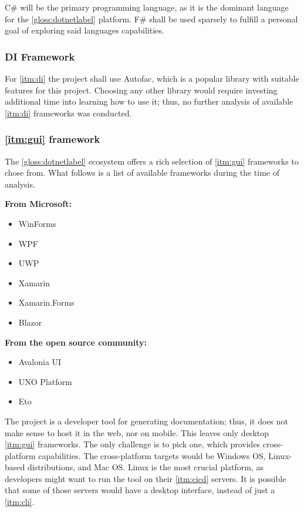 C\# will be the primary programming language, as it is the dominant language for the \ref{gloss:dotnetlabel} platform.
F\# shall be used sparsely to fulfill a personal goal of exploring said languages capabilities.

\subsubsection{DI Framework}

For \ref{itm:di} the project shall use Autofac, which is a popular library with suitable features for this project. Choosing any other library would require investing additional time into learning how to use it; thus, no further analysis of available \ref{itm:di} frameworks was conducted.

\subsubsection{\ref{itm:gui} framework} \label{sec:guiFramework}

The \ref{gloss:dotnetlabel} ecosystem offers a rich selection of \ref{itm:gui} frameworks to chose from. What follows is a list of available frameworks during the time of analysis.

\textbf{From Microsoft:}
\begin{itemize}
    \item WinForms
    \item WPF
    \item UWP
    \item Xamarin
    \item Xamarin.Forms
    \item Blazor
\end{itemize}

\textbf{From the open source community:}
\begin{itemize}
    \item Avalonia UI
    \item UNO Platform
    \item Eto
\end{itemize}

The project is a developer tool for generating documentation; thus, it does not make sense to host it in the web, nor on mobile. This leaves only desktop \ref{itm:gui} frameworks. The only challenge is to pick one, which provides cross-platform capabilities. The cross-platform targets would be Windows OS, Linux-based distributions, and Mac OS.
Linux is the most crucial platform, as developers might want to run the tool on their \ref{itm:cicd} servers. It is possible that some of those servers would have a desktop interface, instead of just a \ref{itm:cli}.

